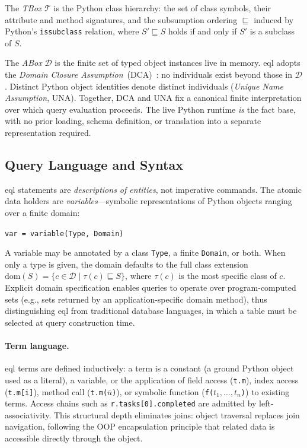 \documentclass{article}
\begin{document}
The \emph{TBox} $\mathcal{T}$ is the Python class hierarchy: the set of
class symbols, their attribute and method signatures, and the subsumption
ordering $\sqsubseteq$ induced by Python's \texttt{issubclass} relation,
where $S' \sqsubseteq S$ holds if and only if $S'$ is a subclass of $S$.

The \emph{ABox} $\mathcal{D}$ is the finite set of typed object instances
live in memory. \ac{eql} adopts the \emph{Domain Closure
Assumption}~(DCA)~\cite{Reiter1978}: no individuals exist beyond those in
$\mathcal{D}$. Distinct Python object identities denote distinct individuals
(\emph{Unique Name Assumption}, UNA). Together, DCA and UNA fix a canonical finite interpretation over which query
evaluation proceeds. The live Python runtime \emph{is} the fact base,
with no prior loading, schema definition, or translation into a separate
representation required.


\subsection{Query Language and Syntax}
\label{ssec:eql_syntax}

\ac{eql} statements are \emph{descriptions of entities}, not imperative
commands. The atomic data holders are \emph{variables}---symbolic
representations of Python objects ranging over a finite domain:
%
\begin{center}
  \texttt{var = variable(Type, Domain)}
\end{center}
%
A variable may be annotated by a class \texttt{Type}, a finite
\texttt{Domain}, or both. When only a type is given, the domain defaults to
the full class extension $\mathrm{dom}(S) = \{c \in \mathcal{D} \mid \tau(c)
\sqsubseteq S\}$, where $\tau(c)$ is the most specific class of $c$. Explicit
domain specification enables queries to operate over program-computed
sets (e.g., sets returned by an application-specific domain method), thus distinguishing
\ac{eql} from traditional database languages, in which a table must be
selected at query construction time.

\paragraph{Term language.}
\ac{eql} terms are defined inductively: a term is a constant (a ground Python
object used as a literal), a variable, or the application of field access
(\texttt{t.m}), index access (\texttt{t.m[i]}), method call
(\texttt{t.m($\bar{u}$)}), or symbolic function (\texttt{f($t_1,\ldots,t_n$)})
to existing terms. Access chains such as \texttt{r.tasks[0].completed} are
admitted by left-associativity. This structural depth eliminates joins: object traversal replaces join
navigation, following the OOP encapsulation principle that related data is
accessible directly through the object.
\end{document}
